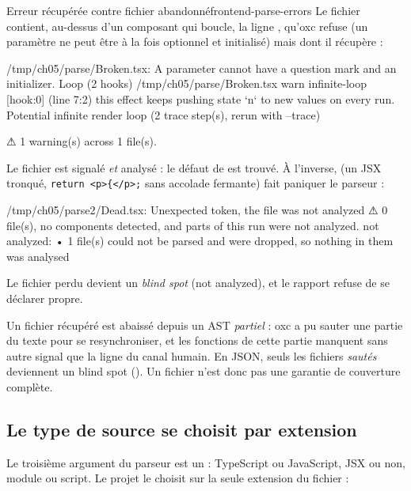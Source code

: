 \begin{exemple}{Erreur récupérée contre fichier abandonné}{frontend-parse-errors}
Le fichier  contient, au-dessus d'un composant  qui boucle, la ligne , qu'oxc refuse (un paramètre ne peut être à la fois optionnel et initialisé) mais dont il récupère :
\begin{sortie}
 /tmp/ch05/parse/Broken.tsx: A parameter cannot have a question mark and an initializer.
  Loop  (2 hooks)  /tmp/ch05/parse/Broken.tsx
    warn   infinite-loop  [hook:0]  (line 7:2)  this effect keeps pushing state `n` to new values on every run. Potential infinite render loop
       (2 trace step(s), rerun with --trace)

⚠  1 warning(s) across 1 file(s).
\end{sortie}
Le fichier est signalé \emph{et} analysé : le défaut de  est trouvé. À l'inverse,  (un JSX tronqué, \texttt{return <p>\{</p>;} sans accolade fermante) fait paniquer le parseur :
\begin{sortie}
[skipped] /tmp/ch05/parse2/Dead.tsx: Unexpected token, the file was not analyzed
⚠  0 file(s), no components detected, and parts of this run were not analyzed.
   not analyzed:
     • 1 file(s) could not be parsed and were dropped, so nothing in them was analysed
\end{sortie}
Le fichier perdu devient un \emph{blind spot} (\og not analyzed\fg{}), et le rapport refuse de se déclarer propre.
\end{exemple}

\begin{piege}
Un fichier récupéré est abaissé depuis un AST \emph{partiel} : oxc a pu sauter une partie du texte pour se resynchroniser, et les fonctions de cette partie manquent sans autre signal que la ligne  du canal humain. En JSON, seuls les fichiers \emph{sautés} deviennent un blind spot  (). Un fichier  n'est donc pas une garantie de couverture complète.
\end{piege}

\subsection{Le type de source se choisit par extension}

Le troisième argument du parseur est un  : TypeScript ou JavaScript, JSX ou non, module ou script. Le projet le choisit sur la seule extension du fichier :

